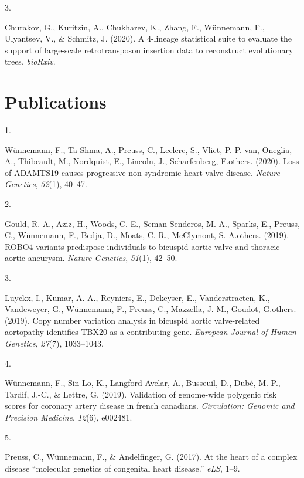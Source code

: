 \documentclass[11pt,a4paper,]{awesome-cv}
\newlength{\csllabelwidth}
\newcommand{\CSLLeftMargin}[1]{\parbox[t]{\csllabelwidth}{#1}}
\newcommand{\CSLRightInline}[1]{\parbox[t]{\linewidth - \csllabelwidth}{#1}}
\begin{document}
\leavevmode{}%
\CSLLeftMargin{3. }
\CSLRightInline{Churakov, G., Kuritzin, A., Chukharev, K., Zhang, F.,
Wünnemann, F., Ulyantsev, V., \& Schmitz, J. (2020). A 4-lineage
statistical suite to evaluate the support of large-scale retrotransposon
insertion data to reconstruct evolutionary trees. \emph{bioRxiv}.}

\hypertarget{publications}{%
\section{\texorpdfstring{
Publications}{ Publications}}\label{publications}}

\hypertarget{bibliography}{}
\leavevmode{}%
\CSLLeftMargin{1. }
\CSLRightInline{Wünnemann, F., Ta-Shma, A., Preuss, C., Leclerc, S.,
Vliet, P. P. van, Oneglia, A., Thibeault, M., Nordquist, E., Lincoln,
J., Scharfenberg, F.others. (2020). Loss of ADAMTS19 causes progressive
non-syndromic heart valve disease. \emph{Nature Genetics}, \emph{52}(1),
40--47.}

\leavevmode{}%
\CSLLeftMargin{2. }
\CSLRightInline{Gould, R. A., Aziz, H., Woods, C. E., Seman-Senderos, M.
A., Sparks, E., Preuss, C., Wünnemann, F., Bedja, D., Moats, C. R.,
McClymont, S. A.others. (2019). ROBO4 variants predispose individuals to
bicuspid aortic valve and thoracic aortic aneurysm. \emph{Nature
Genetics}, \emph{51}(1), 42--50.}

\leavevmode{}%
\CSLLeftMargin{3. }
\CSLRightInline{Luyckx, I., Kumar, A. A., Reyniers, E., Dekeyser, E.,
Vanderstraeten, K., Vandeweyer, G., Wünnemann, F., Preuss, C., Mazzella,
J.-M., Goudot, G.others. (2019). Copy number variation analysis in
bicuspid aortic valve-related aortopathy identifies TBX20 as a
contributing gene. \emph{European Journal of Human Genetics},
\emph{27}(7), 1033--1043.}

\leavevmode{}%
\CSLLeftMargin{4. }
\CSLRightInline{Wünnemann, F., Sin Lo, K., Langford-Avelar, A.,
Busseuil, D., Dubé, M.-P., Tardif, J.-C., \& Lettre, G. (2019).
Validation of genome-wide polygenic risk scores for coronary artery
disease in french canadians. \emph{Circulation: Genomic and Precision
Medicine}, \emph{12}(6), e002481.}

\leavevmode{}%
\CSLLeftMargin{5. }
\CSLRightInline{Preuss, C., Wünnemann, F., \& Andelfinger, G. (2017). At
the heart of a complex disease {``molecular genetics of congenital heart
disease.''} \emph{eLS}, 1--9.}
\end{document}
